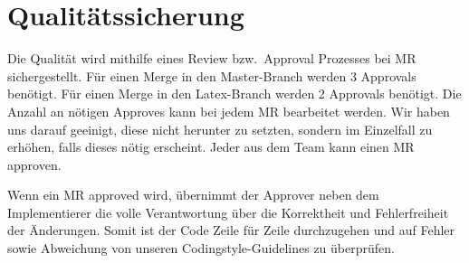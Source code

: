 \section{Qualitätssicherung}\label{sec:qualitaetssicherung}

Die Qualität wird mithilfe eines Review bzw.\ Approval Prozesses bei MR sichergestellt.
Für einen Merge in den Master-Branch werden 3 Approvals benötigt.
Für einen Merge in den Latex-Branch werden 2 Approvals benötigt.
Die Anzahl an nötigen Approves kann bei jedem MR bearbeitet werden.
Wir haben uns darauf geeinigt, diese nicht herunter zu setzten,
sondern im Einzelfall zu erhöhen, falls dieses nötig erscheint.
Jeder aus dem Team kann einen MR approven.

Wenn ein MR approved wird, übernimmt der Approver neben dem Implementierer die volle Verantwortung
über die Korrektheit und Fehlerfreiheit der Änderungen.
Somit ist der Code Zeile für Zeile durchzugehen und auf Fehler sowie Abweichung von
unseren Codingstyle-Guidelines zu überprüfen.


